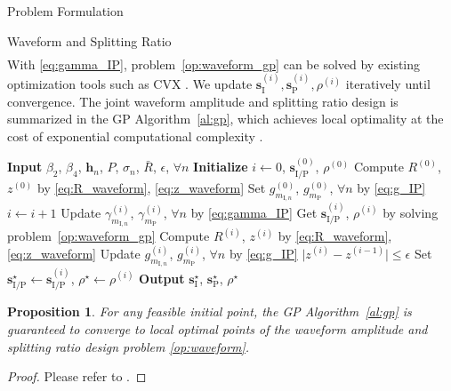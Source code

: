 \documentclass[journal,12pt,onecolumn,draftclsnofoot]{IEEEtran}
\newtheorem{proposition}{Proposition}
\begin{document}
\begin{section}{Problem Formulation}
\begin{subsection}{Waveform and Splitting Ratio}
\begin{align}
			\end{align}
			With \eqref{eq:gamma_IP}, problem~\eqref{op:waveform_gp} can be solved by existing optimization tools such as CVX \cite{Grant2008}. We update $\boldsymbol{s}_{\mathrm{I}}^{(i)},\boldsymbol{s}_\mathrm{P}^{(i)},\rho^{(i)}$ iteratively until convergence. The joint waveform amplitude and splitting ratio design is summarized in the GP Algorithm~\ref{al:gp}, which achieves local optimality at the cost of exponential computational complexity \cite{Chiang2005}.

			\begin{algorithm}[!t]
				\caption{GP: Waveform Amplitude and Splitting Ratio.}
				\label{al:gp}
				\begin{algorithmic}[1]
					\State \textbf{Input} $\beta_2$, $\beta_4$, $\boldsymbol{h}_n$, $P$, $\sigma_n$, $\bar{R}$, $\epsilon$, $\forall n$
					\State \textbf{Initialize} $i \gets 0$, $\boldsymbol{s}_{\mathrm{I/P}}^{(0)}$, $\rho^{(0)}$
					\State Compute $R^{(0)}$, $z^{(0)}$ by \eqref{eq:R_waveform}, \eqref{eq:z_waveform}
					\State Set $g_{m_{\mathrm{I},n}}^{(0)}$, $g_{m_\mathrm{P}}^{(0)}$, $\forall n$ by \eqref{eq:g_IP}
					\Repeat
						\State $i \gets i + 1$
						\State Update $\gamma_{m_{\mathrm{I},n}}^{(i)}$, $\gamma_{m_\mathrm{P}}^{(i)}$, $\forall n$ by \eqref{eq:gamma_IP}
						\State Get $\boldsymbol{s}_{\mathrm{I/P}}^{(i)}$, $\rho^{(i)}$ by solving problem~\eqref{op:waveform_gp}
						\State Compute $R^{(i)}$, $z^{(i)}$ by \eqref{eq:R_waveform}, \eqref{eq:z_waveform}
						\State Update $g_{m_{\mathrm{I},n}}^{(i)}$, $g_{m_\mathrm{P}}^{(i)}$, $\forall n$ by \eqref{eq:g_IP}
					\Until $\lvert z^{(i)} - z^{(i-1)} \rvert \le \epsilon$
					\State Set $\boldsymbol{s}_{\mathrm{I/P}}^{\star} \gets \boldsymbol{s}_{\mathrm{I/P}}^{(i)}$, $\rho^{\star} \gets \rho^{(i)}$
					\State \textbf{Output} $\boldsymbol{s}_{\mathrm{I}}^{\star}$, $\boldsymbol{s}_{\mathrm{P}}^{\star}$, $\rho^{\star}$
				\end{algorithmic}
			\end{algorithm}

			\begin{proposition}\label{pr:gp}
				For any feasible initial point, the GP Algorithm~\ref{al:gp} is guaranteed to converge to local optimal points of the waveform amplitude and splitting ratio design problem \eqref{op:waveform}.
			\end{proposition}

			\begin{proof}\label{pf:gp}
				Please refer to \cite{Clerckx2016a,Clerckx2018b}.
			\end{proof}
		\end{subsection}



\end{section}
\end{document}
